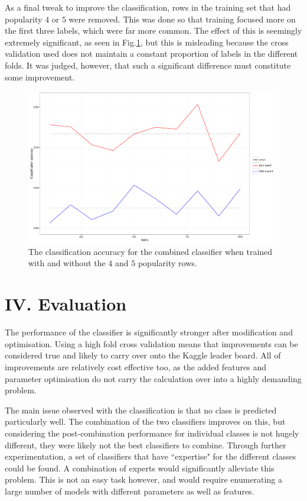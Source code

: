\documentclass[onecolumn,prl,aps,10pt]{revtex4}
\begin{document}
As a final tweak to improve the classification, rows in the training set that had popularity $4$ or $5$ were removed. This was done so that training focused more on the first three labels, which were far more common. The effect of this is seemingly extremely significant, as seen in Fig.\ref{remg}, but this is misleading because the cross validation used does not maintain a constant proportion of labels in the different folds. It was judged, however, that such a significant difference must constitute some improvement.

\begin{figure}
\includegraphics*[height=0.4\linewidth , width=0.8\linewidth,clip]{rem45.pdf}
\caption{The classification accuracy for the combined classifier when trained with and without the $4$ and $5$ popularity rows.} \label{remg}
\end{figure}


\section{IV. Evaluation}
The performance of the classifier is significantly stronger after modification and optimisation. Using a high fold cross validation means that improvements can be considered true and likely to carry over onto the Kaggle leader board. All of improvements are relatively cost effective too, as the added features and parameter optimisation do not carry the calculation over into a highly demanding problem.

The main issue observed with the classification is that no class is predicted particularly well. The combination of the two classifiers improves on this, but considering the post-combination performance for individual classes is not hugely different, they were likely not the best classifiers to combine. Through further experimentation, a set of classifiers that have \textquotedblleft expertise" for the different classes could be found. A combination of experts would significantly alleviate this problem. This is not an easy task however, and would require enumerating a large number of models with different parameters as well as features.
\end{document}
